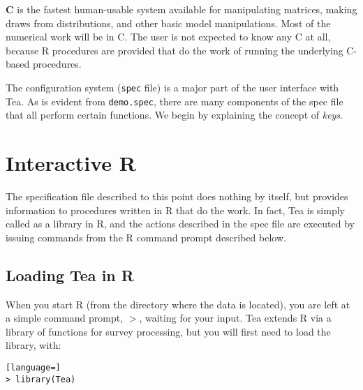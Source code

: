 \documentclass{article}
\begin{document}
{\bf C} is the fastest human-usable system available for manipulating matrices, making
draws from distributions, and other basic model manipulations. Most of the numerical
work will be in C. The user is not expected to know any C at all, because R procedures
are provided that do the work of running the underlying C-based procedures.




%


The configuration system ({\tt spec} file) is a major part of the user interface with Tea. 
As is evident from {\tt demo.spec}, there are many components of the spec file that all 
perform certain functions. We begin by explaining the concept of \textit{keys}.

\section{Interactive R}\label{rsec}
The specification file described to this point does nothing by itself, but provides
information to procedures written in R that do the work. In fact, Tea is simply 
called as a library in R, and the actions described in the spec file are executed by
issuing commands from the R command prompt described below.

\subsection{Loading Tea in R}
When you start R (from the directory where the data is located), you are left at a
simple command prompt, $>$, waiting for your input. Tea extends R via a library of
functions for survey processing, but you will first need to load the library, with:
\begin{lstlisting}[language=]
> library(Tea)
\end{lstlisting}
\end{document}
